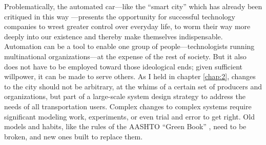 Problematically, the automated car---like the
``smart city'' which has already been critiqued in this
way \cite{greenfieldSmart}---presents the opportunity for successful technology
companies to wrest greater control over everyday life, to worm their
way more deeply into our existence and thereby make themselves
indispensable. Automation can be a tool to enable one group of
people---technologists running multinational organizations---at the
expense of the rest of society.
But it also does not have to be employed toward those ideological
ends; given sufficient willpower, it can be made to serve others.
As I held in chapter \ref{chap:2}, changes to the city
should not be arbitrary, at the whims of a certain set of
producers and organizations, but part of a large-scale system design
strategy to address the needs of all transportation users. Complex
changes to complex systems require significant modeling work,
experiments, or even trial and error to get right. Old models and
habits, like the rules of the AASHTO ``Green
Book'' \cite[p. 181, 183]{swopeTrenton}, need to be broken, and new
ones built to replace them. 



